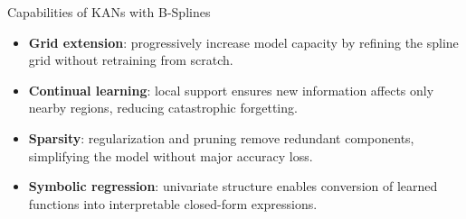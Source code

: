 \documentclass[aspectratio=169]{beamer}
\begin{document}

\begin{frame}{Capabilities of KANs with B-Splines}
	
	\begin{itemize}
		\item \textbf{Grid extension}: progressively increase model capacity by refining the spline grid without retraining from scratch.
		\item \textbf{Continual learning}: local support ensures new information affects only nearby regions, reducing catastrophic forgetting.
		\item \textbf{Sparsity}: regularization and pruning remove redundant components, simplifying the model without major accuracy loss.
		\item \textbf{Symbolic regression}: univariate structure enables conversion of learned functions into interpretable closed-form expressions.
	\end{itemize}
	
\end{frame}

\end{document}
